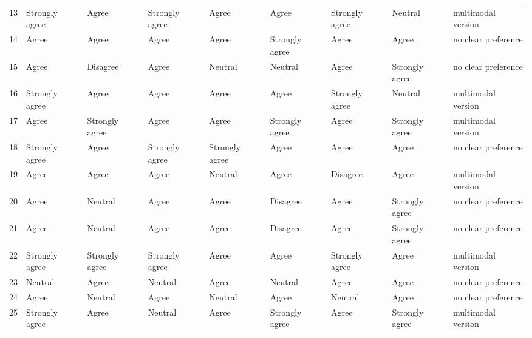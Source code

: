 \documentclass[sigconf]{acmart}
\begin{document}
\begin{table}[htbp]
\begin{tabularx}{\textwidth}{c *{8}{>{\raggedright\arraybackslash}X}}
13 & Strongly agree & Agree & Strongly agree & Agree & Agree & Strongly agree & Neutral & multimodal version \\
14 & Agree & Agree & Agree & Agree & Strongly agree & Agree & Agree & no clear preference \\
15 & Agree & Disagree & Agree & Neutral & Neutral & Agree & Strongly agree & no clear preference \\
16 & Strongly agree & Agree & Agree & Agree & Agree & Strongly agree & Neutral & multimodal version \\
17 & Agree & Strongly agree & Agree & Agree & Strongly agree & Agree & Strongly agree & multimodal version \\
18 & Strongly agree & Agree & Strongly agree & Strongly agree & Agree & Agree & Agree & no clear preference \\
19 & Agree & Agree & Agree & Neutral & Agree & Disagree & Agree & multimodal version \\
20 & Agree & Neutral & Agree & Agree & Disagree & Agree & Strongly agree & no clear preference \\
21 & Agree & Neutral & Agree & Agree & Disagree & Agree & Strongly agree & no clear preference \\
22 & Strongly agree & Strongly agree & Strongly agree & Agree & Agree & Strongly agree & Agree & multimodal version \\
23 & Neutral & Agree & Neutral & Agree & Neutral & Agree & Agree & no clear preference \\
24 & Agree & Neutral & Agree & Neutral & Agree & Neutral & Agree & no clear preference \\
25 & Strongly agree & Agree & Neutral & Agree & Strongly agree & Agree & Strongly agree & multimodal version \\
\bottomrule
  \end{tabularx}
\end{table}
\end{document}
